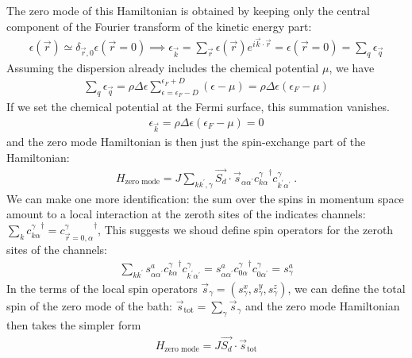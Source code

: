 \documentclass{revtex4-2}
\begin{document}
The zero mode of this Hamiltonian is obtained by keeping only the central component of the Fourier transform of the kinetic energy part:
\begin{align}
	\epsilon(\vec r) \simeq \delta_{\vec r,0}\epsilon(\vec r = 0) \implies \epsilon_{\vec k} = \sum_{\vec r}\epsilon(\vec r) e^{i \vec{k}\cdot\vec{r}} = \epsilon(\vec r=0) = \sum_q \epsilon_{\vec q}
\end{align}
Assuming the dispersion already includes the chemical potential \(\mu\), we have 
\begin{align}
\sum_q \epsilon_{\vec q} = \rho \Delta \epsilon\sum_{\epsilon=\epsilon_F-D}^{\epsilon_F + D} \left(\epsilon - \mu\right) = \rho\Delta \epsilon\left(\epsilon_F - \mu\right)
\end{align}
If we set the chemical potential at the Fermi surface, this summation vanishes.
\begin{align}
	\epsilon_{\vec k} =  \rho\Delta \epsilon\left(\epsilon_F - \mu\right) = 0
\end{align}
and the zero mode Hamiltonian is then just the spin-exchange part of the Hamiltonian:
\begin{align}
	H_\text{zero mode} = J\sum_{kk^\prime,\gamma} \vec{S_d}\cdot\vec{s}_{\alpha\alpha^\prime}{c^\gamma_{k\alpha}}^\dagger c^\gamma_{k^\prime\alpha^\prime}~.
\end{align}
We can make one more identification: the sum over the spins in momentum space amount to a local interaction at the zeroth sites of the indicates channels: \(\sum_k {c^\gamma_{k\alpha}}^\dagger = {c^\gamma_{\vec r=0, \alpha}}^\dagger\), This suggests we shoud define spin operators for the zeroth sites of the channels:
\begin{align}
	\sum_{kk^\prime} {s}^a_{\alpha\alpha^\prime}{c^\gamma_{k\alpha}}^\dagger c^\gamma_{k^\prime\alpha^\prime} = {s}^a_{\alpha\alpha^\prime}{c^\gamma_{0\alpha}}^\dagger c^\gamma_{0\alpha^\prime} = s_\gamma^a
\end{align}
In the terms of the local spin operators \(\vec s_\gamma = (s_\gamma^x,s_\gamma^y,s_\gamma^z)\), we can define the total spin of the zero mode of the bath: \(\vec s_\text{tot} = \sum_\gamma \vec s_\gamma\) and the zero mode Hamiltonian then takes the simpler form
\begin{align}
	\label{zeromode_ham}
	H_\text{zero mode} = J \vec{S_d}\cdot\vec{s}_\text{tot}
\end{align}
\end{document}
